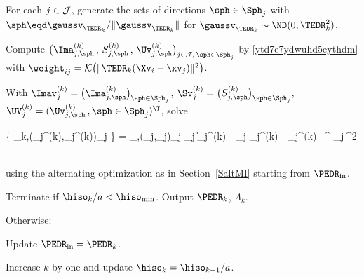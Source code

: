 \begin{mylist}


\item
For each \( j \in \mathcal{J} \), 
generate the sets of directions \( \sph \in \Sph_{j} \) with
\( \sph \eqd \gaussv_{\TEDR_{k}}/\| \gaussv_{\TEDR_{k}} \| \) for 
\( \gaussv_{\TEDR_{k}} \sim \ND(0,\TEDR_{k}^{2}) \).

\item 
Compute \( \bigl( \Ima_{j,\sph}^{(k)} \, , \, S_{j,\sph}^{(k)} \, , \, \Uv_{j,\sph}^{(k)} \bigr)_{j \in \JJJ , \, \sph \in \Sph_{j}} \) 
by \eqref{ytd7e7ydwuhd5eythdm} with \( \weight_{ij} = \Kern\bigl( \| \TEDR_{k} (\Xv_{i} - \xv_{j}) \|^{2} \bigr) \).

\item
With 
\( \Imav_{j}^{(k)} = \bigl( \Ima_{j,\sph}^{(k)} \bigr)_{\sph \in \Sph_{j}} \),
\( \Sv_{j}^{(k)} = \bigl( S_{j,\sph}^{(k)} \bigr)_{\sph \in \Sph_{j}} \),
\( \UV_{j}^{(k)} = (\Uv_{j,\sph}^{(k)} \, , \sph \in \Sph_{j})^{\T} \),
solve
\begin{EQA}[c]
	\bigl\{ \PEDR_{k},(\fcn_{j}^{(k)},\fclv_{j}^{(k)})_{j \in \JJJ} \bigr\}
	=
	\arginf_{\PEDR,(\fcn_{j},\fclv_{j})_{j \in \JJJ}}
	\sum_{j \in \JJJ} \bigl\| \Imav_{j}^{(k)} - \fcn_{j} \Sv_{j}^{(k)} - \UV_{j}^{(k)} \, \PEDR^{\T} \fclv_{j} \bigr\|^{2} 
	\, 
\end{EQA}
using the alternating optimization as in Section~\ref{SaltMI} starting from 
\( \PEDR_{\init} \).

\item
Terminate if \( \hiso_{k}/a < \hiso_{\min} \).
Output \( \PEDR_{k} \), \( \Lambda_{k} \).

\item 
Otherwise:
\begin{mylist}


\item
Update \( \PEDR_{\init} = \PEDR_{k} \).

\item
Increase \( k \) by one and update \( \hiso_{k} = \hiso_{k-1} / a \).



\end{mylist}
\end{mylist}
